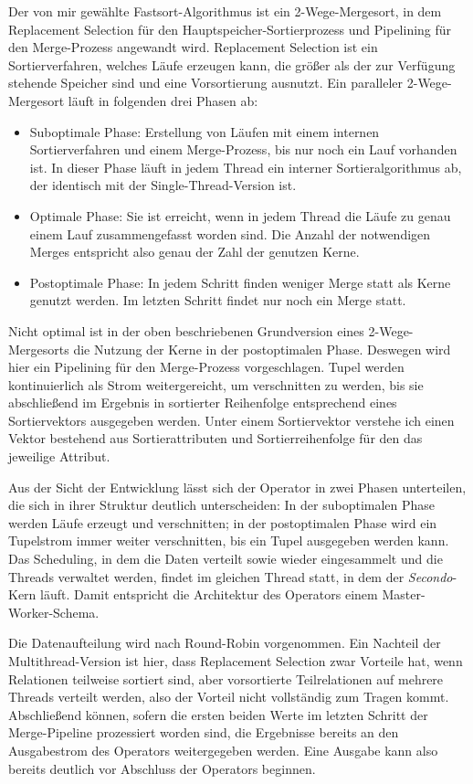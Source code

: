 \documentclass[a4paper,12pt,twoside]{article}
\newcommand{\Fb}[1]{\textit{#1}} %
\begin{document}
Der von mir gewählte Fastsort-Algorithmus ist ein 2-Wege-Mergesort, in dem Replacement Selection für den Hauptspeicher-Sortierprozess und Pipelining für den Merge-Prozess angewandt wird. Replacement Selection ist ein Sortierverfahren, welches Läufe erzeugen kann, die größer als der zur Verfügung stehende Speicher sind und eine Vorsortierung ausnutzt. Ein paralleler 2-Wege-Mergesort läuft in folgenden drei Phasen ab:

\begin{itemize}
	\item Suboptimale Phase: Erstellung von Läufen mit einem internen Sortierverfahren und einem Merge-Prozess, bis nur noch ein Lauf vorhanden ist. In dieser Phase läuft in jedem Thread ein interner Sortieralgorithmus ab, der identisch mit der Single-Thread-Version ist.
	\item Optimale Phase: Sie ist erreicht, wenn in jedem Thread die Läufe zu genau einem Lauf zusammengefasst worden sind. Die Anzahl der notwendigen Merges entspricht also genau der Zahl der genutzen Kerne. 
	\item Postoptimale Phase: In jedem Schritt finden weniger Merge statt als Kerne genutzt werden. Im letzten Schritt findet nur noch ein Merge statt.
\end{itemize}

Nicht optimal ist in der oben beschriebenen Grundversion eines 2-Wege-Mergesorts die Nutzung der Kerne in der postoptimalen Phase. Deswegen wird hier ein Pipelining für den Merge-Prozess vorgeschlagen. Tupel werden kontinuierlich als Strom weitergereicht, um verschnitten zu werden, bis sie abschließend im Ergebnis in sortierter Reihenfolge entsprechend eines Sortiervektors ausgegeben werden. Unter einem Sortiervektor verstehe ich einen Vektor bestehend aus Sortierattributen und Sortierreihenfolge für den das jeweilige Attribut. 

Aus der Sicht der Entwicklung lässt sich der Operator in zwei Phasen unterteilen, die sich in ihrer Struktur deutlich unterscheiden: In der suboptimalen Phase werden Läufe erzeugt und verschnitten; in der postoptimalen Phase wird ein Tupelstrom immer weiter verschnitten, bis ein Tupel ausgegeben werden kann. Das Scheduling, in dem die Daten verteilt sowie wieder eingesammelt und die Threads verwaltet werden, findet im gleichen Thread statt, in dem der \Fb{Secondo}-Kern läuft. Damit entspricht die Architektur des Operators einem Master-Worker-Schema.

Die Datenaufteilung wird nach Round-Robin vorgenommen. Ein Nachteil der Multithread-Version ist hier, dass Replacement Selection zwar Vorteile hat, wenn Relationen teilweise sortiert sind, aber vorsortierte Teilrelationen auf mehrere Threads verteilt werden, also der Vorteil nicht vollständig zum Tragen kommt. Abschließend können, sofern die ersten beiden Werte im letzten Schritt der Merge-Pipeline prozessiert worden sind, die Ergebnisse bereits an den Ausgabestrom des Operators weitergegeben werden. Eine Ausgabe kann also bereits deutlich vor Abschluss der Operators beginnen.
\end{document}
